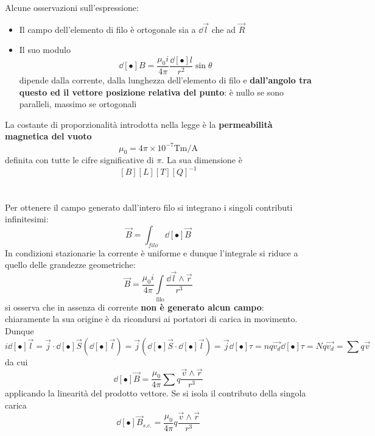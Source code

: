 
Alcune osservazioni sull'espressione:

\begin{itemize}
\item Il campo dell'elemento di filo è ortogonale sia a $\dd{\vec{l}}$ che ad $\vec{R}$
\item Il suo modulo 
\[\dd[•]{B} = \frac{\mu_0 i}{4 \pi} \frac{\dd[•]{l}}{r^2} \sin \theta\]
dipende dalla corrente, dalla lunghezza dell'elemento di filo e \textbf{dall'angolo tra questo ed il vettore posizione relativa del punto}: è nullo se sono paralleli, massimo se ortogonali
\end{itemize}

La costante di proporzionalità introdotta nella legge è la \textbf{permeabilità magnetica del vuoto}
\[\mu_0 = 4 \pi \times 10^{-7} \mathrm{Tm/A}\]
definita con tutte le cifre significative di $\pi$. La sua dimensione è
\[[B] [L] [T] [Q]^{-1}\]
\, \\~\\
Per ottenere il campo generato dall'intero filo si integrano i singoli contributi infinitesimi:
\[\vec{B} = \int_{filo} \dd[•]{\vec{B}}\]
In condizioni stazionarie la corrente è uniforme e dunque l'integrale si riduce a quello delle grandezze geometriche:
\[\vec{B} = \frac{\mu_0 i}{4 \pi} \int\limits_{\textrm{filo}} \frac{\dd{\vec{l}} \wedge \vec{r}}{r^3}\]
si osserva che in assenza di corrente \textbf{non è generato alcun campo}: chiaramente la sua origine è da ricondursi ai portatori di carica in movimento. Dunque
\[i \dd[•]{\vec{l}} = \vec{j} \cdot \dd[•]{\vec{S}} (\dd[•]{\vec{l}}) = \vec{j} (\dd[•]{\vec{S}} \cdot \dd[•]{\vec{l}}) = \vec{j} \dd[•]{\tau} = n q \vec{v_d} \dd[•]{\tau} = N q \vec{v_d} = \sum q \vec{v}\]
da cui 
\[\dd[•]{\vec{B}} = \frac{\mu_0}{4 \pi} \sum q \frac{\vec{v} \wedge \vec{r}}{r^3}\]
applicando la linearità del prodotto vettore. Se si isola il contributo della singola carica
\[\dd[•]{\vec{B}}_{s. c.} = \frac{\mu_0}{4 \pi} q \frac{\vec{v} \wedge \vec{r}}{r^3}\]

